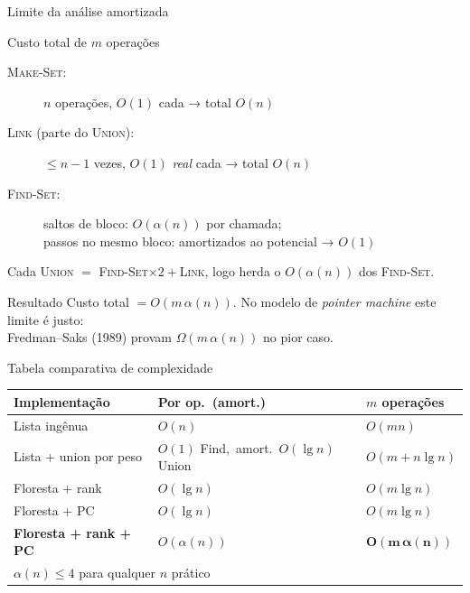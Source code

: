 \documentclass[aspectratio=169]{beamer}
\begin{document}
\begin{frame}{Limite da análise amortizada}%
  \begin{block}{Custo total de $m$ operações}
    \begin{description}
      \item[\textsc{Make-Set}:] $n$ operações, $O(1)$ cada → total $O(n)$
      \item[\textsc{Link} (parte do \textsc{Union}):] $\leq n-1$ vezes, $O(1)$ \emph{real} cada → total $O(n)$
      \item[\textsc{Find-Set}:] saltos de bloco: $O(\alpha(n))$ por chamada;\\
        passos no mesmo bloco: amortizados ao potencial → $O(1)$
    \end{description}
    \vspace{2pt}
    \footnotesize Cada \textsc{Union} $=$ \textsc{Find-Set}$\times 2 + $\textsc{Link}, logo herda o $O(\alpha(n))$ dos \textsc{Find-Set}.
  \end{block}
  \vspace{0.3cm}
  \begin{block}{Resultado}
    Custo total $= O(m\,\alpha(n))$. No modelo de \emph{pointer machine} este limite é justo:\\
    Fredman--Saks (1989) provam $\Omega(m\,\alpha(n))$ no pior caso.
  \end{block}
\end{frame}

\begin{frame}{Tabela comparativa de complexidade}%
  \begin{center}
  \renewcommand{\arraystretch}{1.4}
  \begin{tabular}{lll}
    \toprule
    \textbf{Implementação} & \textbf{Por op.\ (amort.)} & \textbf{$m$ operações} \\
    \midrule
    Lista ingênua               & $O(n)$         & $O(mn)$ \\
    Lista + union por peso      & $O(1)$ Find,\ amort.\ $O(\lg n)$ Union & $O(m+n\lg n)$ \\
    Floresta + rank             & $O(\lg n)$     & $O(m\lg n)$ \\
    Floresta + PC               & $O(\lg n)$     & $O(m\lg n)$ \\
    \textbf{Floresta + rank + PC} & $O(\alpha(n))$ & $\mathbf{O(m\,\alpha(n))}$ \\
    \bottomrule
    \multicolumn{3}{l}{\small $\alpha(n) \leq 4$ para qualquer $n$ prático} \\
  \end{tabular}
  \end{center}
\end{frame}
\end{document}
